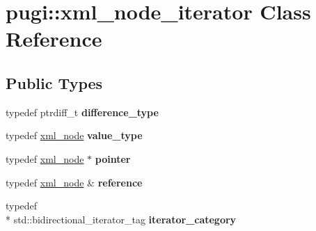 \hypertarget{classpugi_1_1xml__node__iterator}{\section{pugi\-:\-:xml\-\_\-node\-\_\-iterator Class Reference}
\label{classpugi_1_1xml__node__iterator}
}
\subsection*{Public Types}
\begin{DoxyCompactItemize}
\item 
\hypertarget{classpugi_1_1xml__node__iterator_af493930602ec2f56d27c84d148d692ef}{typedef ptrdiff\-\_\-t {\bfseries difference\-\_\-type}}\label{classpugi_1_1xml__node__iterator_af493930602ec2f56d27c84d148d692ef}

\item 
\hypertarget{classpugi_1_1xml__node__iterator_a2b0d0c1dd1238c23ef07feeb6069393f}{typedef \hyperlink{classpugi_1_1xml__node}{xml\-\_\-node} {\bfseries value\-\_\-type}}\label{classpugi_1_1xml__node__iterator_a2b0d0c1dd1238c23ef07feeb6069393f}

\item 
\hypertarget{classpugi_1_1xml__node__iterator_a8e5476d1f854eb64f92f42dac648acf1}{typedef \hyperlink{classpugi_1_1xml__node}{xml\-\_\-node} $\ast$ {\bfseries pointer}}\label{classpugi_1_1xml__node__iterator_a8e5476d1f854eb64f92f42dac648acf1}

\item 
\hypertarget{classpugi_1_1xml__node__iterator_ae2efdeb44673427f99b7cc1e726bfa13}{typedef \hyperlink{classpugi_1_1xml__node}{xml\-\_\-node} \& {\bfseries reference}}\label{classpugi_1_1xml__node__iterator_ae2efdeb44673427f99b7cc1e726bfa13}

\item 
\hypertarget{classpugi_1_1xml__node__iterator_ac65c62a919aa8818f0f1204ef0ab24c1}{typedef \\*
std\-::bidirectional\-\_\-iterator\-\_\-tag {\bfseries iterator\-\_\-category}}\label{classpugi_1_1xml__node__iterator_ac65c62a919aa8818f0f1204ef0ab24c1}

\end{DoxyCompactItemize}

